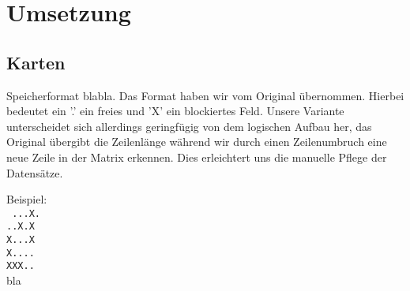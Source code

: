 \section{Umsetzung}


\subsection{Karten}
Speicherformat
blabla.
Das Format haben wir vom Original übernommen. Hierbei bedeutet ein '.' ein
freies und 'X' ein blockiertes Feld. Unsere Variante unterscheidet sich
allerdings geringfügig von dem logischen Aufbau her, das Original übergibt die
Zeilenlänge während wir durch einen Zeilenumbruch eine neue Zeile in der
Matrix erkennen. Dies erleichtert uns die manuelle Pflege der Datensätze.

Beispiel: \\
\texttt{
...X.\\
..X.X\\
X...X\\
X....\\
XXX..\\}
bla